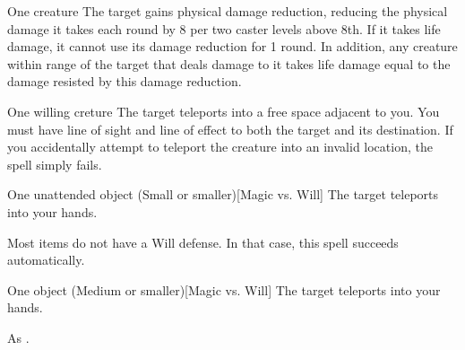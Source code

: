\spellrng{\rngclose}
\spelldur{\durshort}
\begin{spelltarget}{One creature}
    \spelleffect The target gains physical damage reduction, reducing the physical damage it takes each round by 8  per two caster levels above 8th. If it takes life damage, it cannot use its damage reduction for 1 round. In addition, any creature within \rngmed range of the target that deals damage to it takes life damage equal to the damage resisted by this damage reduction.
\end{spelltarget}

\spellrng{\rngmed}
\begin{spelltarget}{One willing creture}
    \spelleffect The target teleports into a free space adjacent to you. You must have line of sight and line of effect to both the target and its destination. If you accidentally attempt to teleport the creature into an invalid location, the spell simply fails.
\end{spelltarget}

\spellrng{\rngclose}
\begin{spelltarget}{One unattended object (Small or smaller)}[Magic vs. Will]
    \spellsuccess The target teleports into your hands.
\end{spelltarget}
\spellnotes Most items do not have a Will defense. In that case, this spell succeeds automatically.

\spellrng{\rngmed}
\begin{spelltarget}{One object (Medium or smaller)}[Magic vs. Will]
    \spelleffect The target teleports into your hands.
\end{spelltarget}
\spellnotes As .

